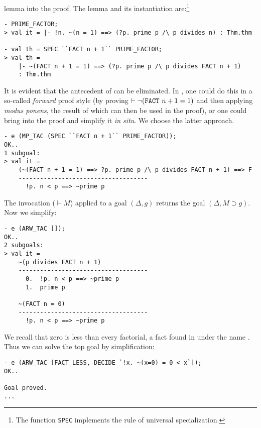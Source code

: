 lemma into the proof. The lemma and its instantiation are:\footnote{The
function {\tt SPEC} implements the rule of universal specialization.}
\begin{session}\begin{verbatim}
- PRIME_FACTOR;
> val it = |- !n. ~(n = 1) ==> (?p. prime p /\ p divides n) : Thm.thm

- val th = SPEC ``FACT n + 1`` PRIME_FACTOR;
> val th =
    |- ~(FACT n + 1 = 1) ==> (?p. prime p /\ p divides FACT n + 1)
    : Thm.thm
\end{verbatim}\end{session}
It is evident that the antecedent of  can be eliminated. In
\holn{}, one could do this in a so-called {\it forward\/} proof style (by
proving $\vdash \neg(\mbox{\tt FACT}\ n + 1 = 1)$ and then applying {\it
modus ponens}, the result of which can then be used in the proof), or
one could bring  into the proof and simplify it {\it in
situ}. We choose the latter approach.
\begin{session}\begin{verbatim}
- e (MP_TAC (SPEC ``FACT n + 1`` PRIME_FACTOR));
OK..
1 subgoal:
> val it =
    (~(FACT n + 1 = 1) ==> ?p. prime p /\ p divides FACT n + 1) ==> F
    ------------------------------------
      !p. n < p ==> ~prime p
\end{verbatim}\end{session}
    The invocation  ($\vdash M$) applied to a goal
    $(\Delta, g)$ returns the goal $(\Delta, M \supset g)$. Now we
    simplify:
\begin{session}\begin{verbatim}
- e (ARW_TAC []);
OK..
2 subgoals:
> val it =
    ~(p divides FACT n + 1)
    ------------------------------------
      0.  !p. n < p ==> ~prime p
      1.  prime p

    ~(FACT n = 0)
    ------------------------------------
      !p. n < p ==> ~prime p
\end{verbatim}\end{session}
    We recall that zero is less than every factorial, a fact found in
     under the name . Thus we can
    solve the top goal by simplification:
\begin{session}\begin{verbatim}
- e (ARW_TAC [FACT_LESS, DECIDE `!x. ~(x=0) = 0 < x`]);
OK..

Goal proved.
...
\end{verbatim}\end{session}
